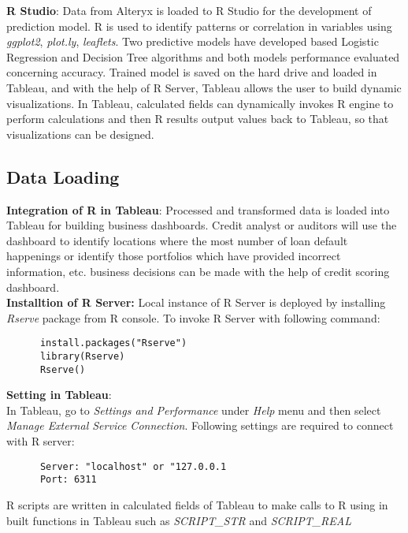 \textbf{R Studio}: Data from Alteryx is loaded to R Studio for the development of prediction model. R is used to identify patterns or correlation in variables using \emph{ggplot2}, \emph{plot.ly}, \emph{leaflets}. Two predictive models have developed based Logistic Regression and Decision Tree algorithms and both models performance evaluated concerning accuracy. Trained model is saved on the hard drive and loaded in Tableau, and with the help of R Server, Tableau allows the user to build dynamic visualizations. In Tableau, calculated fields can dynamically invokes R engine to perform calculations and then R results output values back to Tableau, so that visualizations can be designed.\\


\subsection{Data Loading}\label{tableau}
\textbf{Integration of R in Tableau}: Processed and transformed data is loaded into Tableau for building business dashboards. Credit analyst or auditors will use the dashboard to identify locations where the most number of loan default happenings or identify those portfolios which have provided incorrect information, etc. business decisions can be made with the help of credit scoring dashboard.\\

\textbf{Installtion of R Server:} Local instance of R Server is deployed by installing \emph{Rserve} package from R console. To invoke R Server with following command:
      \begin{verbatim}
      install.packages("Rserve")
      library(Rserve)
      Rserve()
      \end{verbatim}

\textbf{Setting in Tableau}:\\

In Tableau, go to \emph{Settings and Performance} under \emph{Help} menu and then select \emph{Manage External Service Connection}. Following settings are required to connect with R server:
      \begin{verbatim}
      Server: "localhost" or "127.0.0.1
      Port: 6311
      \end{verbatim}

R scripts are written in calculated fields of Tableau to make calls to R using in built functions in Tableau such as \emph{SCRIPT\_STR} and \emph{SCRIPT\_REAL}




